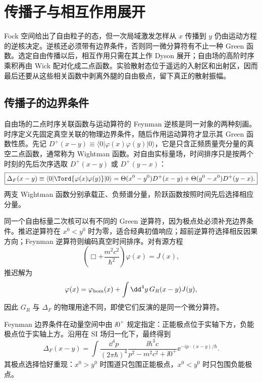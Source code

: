 \section{传播子与相互作用展开}

Fock 空间给出了自由粒子的态，但一次局域激发怎样从 $x$ 传播到 $y$ 仍由运动方程的逆核决定。逆核还必须带有边界条件，否则同一微分算符有不止一种 Green 函数。选定自由传播以后，相互作用只需在其上作 Dyson 展开；自由场的高阶时序乘积再由 Wick 配对化成二点函数。实验散射态位于遥远的入射区和出射区，因而最后还要从这些相关函数中剥离外腿的自由极点，留下真正的散射振幅。

\subsection{传播子的边界条件}

自由场的二点时序关联函数与运动算符的 Feynman 逆核是同一对象的两种刻画。时序定义先固定真空关联的物理边界条件，随后作用运动算符才显示其 Green 函数性质。先记
\(D^+(x-y)\equiv\langle0|\varphi(x)\varphi(y)|0\rangle\)，它是只含正频质量壳分量的真空二点函数，通常称为 Wightman 函数。对自由实标量场，时间排序只是按两个时刻的先后次序选取 \(D^+(x-y)\) 或 \(D^+(y-x)\)：
\begin{equation}
\boxed{
\Delta_F(x-y)
\equiv\langle0|\Tord\{\varphi(x)\varphi(y)\}|0\rangle
=\Theta(x^0-y^0)D^+(x-y)+\Theta(y^0-x^0)D^+(y-x).}
\label{eq:feynman-from-wightman-r3}
\end{equation}
两支 Wightman 函数分别承载正、负频谱分量，阶跃函数按照时间先后选择相应分量。

同一个自由标量二次核可以有不同的 Green 逆算符，因为极点处必须补充边界条件。推迟逆算符在 $x^0<y^0$ 时为零，适合经典初值响应；超前逆算符选择相反因果方向；Feynman 逆算符则编码真空时间排序。对有源方程
\begin{equation*}
\left(\Box+\frac{m^2c^2}{\hbar^2}\right)\varphi(x)=J(x),
\end{equation*}
推迟解为
\begin{equation*}
\varphi(x)=\varphi_{\rm hom}(x)+\int\dd^4 y\,G_R(x-y)J(y),
\end{equation*}
因此 $G_R$ 与 $\Delta_F$ 的物理用途不同，即使它们反演的是同一个微分算符。

Feynman 边界条件在动量空间中由 $\ii0^+$ 规定指定：正能极点位于实轴下方，负能极点位于实轴上方。沿用在 SI 场归一化下，最终得到
\begin{equation}
\boxed{
\Delta_F(x-y)
=\int\frac{\dd^4 p}{(2\pi\hbar)^4}
\frac{\ii\hbar^3c}{p^2-m^2c^2+\ii0^+}
 \ee^{-ip\cdot(x-y)/\hbar}.}
\label{eq:scalar-Fourier-r2}
\end{equation}
其极点选择恰好重现：$x^0>y^0$ 时围道只包围正能极点，$x^0<y^0$ 时只包围负能极点。

